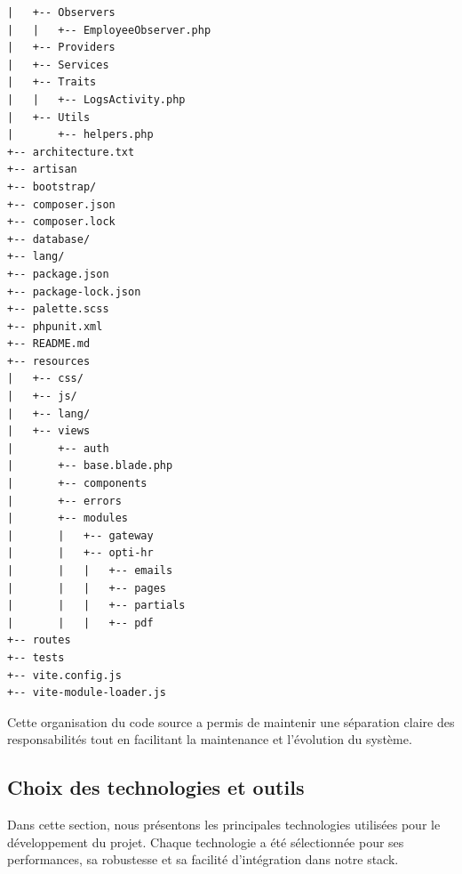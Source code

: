 \begin{tcolorbox}
\begin{lstlisting}
|   +-- Observers
|   |   +-- EmployeeObserver.php
|   +-- Providers
|   +-- Services
|   +-- Traits
|   |   +-- LogsActivity.php
|   +-- Utils
|       +-- helpers.php
+-- architecture.txt
+-- artisan
+-- bootstrap/
+-- composer.json
+-- composer.lock
+-- database/
+-- lang/
+-- package.json
+-- package-lock.json
+-- palette.scss
+-- phpunit.xml
+-- README.md
+-- resources
|   +-- css/
|   +-- js/
|   +-- lang/
|   +-- views
|       +-- auth
|       +-- base.blade.php
|       +-- components
|       +-- errors
|       +-- modules
|       |   +-- gateway
|       |   +-- opti-hr
|       |   |   +-- emails
|       |   |   +-- pages
|       |   |   +-- partials
|       |   |   +-- pdf
+-- routes
+-- tests
+-- vite.config.js
+-- vite-module-loader.js
\end{lstlisting}
\end{tcolorbox}

Cette organisation du code source a permis de maintenir une séparation claire des responsabilités tout en facilitant la maintenance et l'évolution du système.

\subsection{Choix des technologies et outils}
Dans cette section, nous présentons les principales technologies utilisées pour le développement du projet. Chaque technologie a été sélectionnée pour ses performances, sa robustesse et sa facilité d'intégration dans notre stack.

